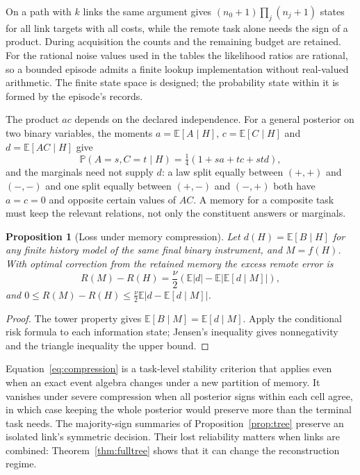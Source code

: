 \documentclass[11pt,a4paper]{article}
\newtheorem{proposition}[definition]{Proposition}
\newcommand{\E}{\mathbb E}
\newcommand{\Pp}{\mathbb P}
\begin{document}
On a path with $k$ links the same argument gives $(n_0+1)\prod_j(n_j+1)$ states for all link targets with all costs, while the remote task alone needs the sign of a product. During acquisition the counts and the remaining budget are retained. For the rational noise values used in the tables the likelihood ratios are rational, so a bounded episode admits a finite lookup implementation without real-valued arithmetic. The finite state space is designed; the probability state within it is formed by the episode's records.

The product $ac$ depends on the declared independence. For a general posterior on two binary variables, the moments $a=\E[A\mid H]$, $c=\E[C\mid H]$ and $d=\E[AC\mid H]$ give
\begin{equation}\label{eq:joint}
 \Pp(A=s,C=t\mid H)=\tfrac14(1+sa+tc+std),
\end{equation}
and the marginals need not supply $d$: a law split equally between $(+,+)$ and $(-,-)$ and one split equally between $(+,-)$ and $(-,+)$ both have $a=c=0$ and opposite certain values of $AC$. A memory for a composite task must keep the relevant relations, not only the constituent answers or marginals.

\begin{proposition}[Loss under memory compression]\label{prop:compression}
Let $d(H)=\E[B\mid H]$ for any finite history model of the same final binary instrument, and $M=f(H)$. With optimal correction from the retained memory the excess remote error is
\begin{equation}\label{eq:compression}
 R(M)-R(H)=\frac\nu2\left(\E|d|-\E|\E[d\mid M]|\right),
\end{equation}
and $0\le R(M)-R(H)\le\frac\nu2\E|d-\E[d\mid M]|$.
\end{proposition}
\begin{proof}
The tower property gives $\E[B\mid M]=\E[d\mid M]$. Apply the conditional risk formula to each information state; Jensen's inequality gives nonnegativity and the triangle inequality the upper bound.
\end{proof}

Equation~\eqref{eq:compression} is a task-level stability criterion that applies even when an exact event algebra changes under a new partition of memory. It vanishes under severe compression when all posterior signs within each cell agree, in which case keeping the whole posterior would preserve more than the terminal task needs. The majority-sign summaries of Proposition~\ref{prop:tree} preserve an isolated link's symmetric decision. Their lost reliability matters when links are combined: Theorem~\ref{thm:fulltree} shows that it can change the reconstruction regime.
\end{document}

